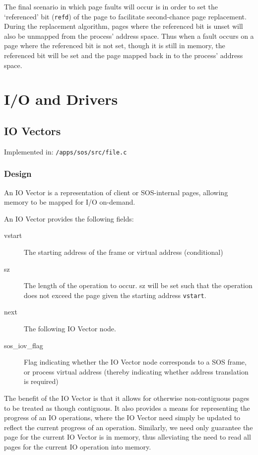 \documentclass[a4paper,12pt]{article}
\begin{document}
The final scenario in which page faults will occur is in order to set the
`referenced' bit (\texttt{refd}) of the page to facilitate second-chance page
replacement.  During the replacement algorithm, pages where the referenced bit
is unset will also be unmapped from the process' address space.  Thus when a
fault occurs on a page where the referenced bit is not set, though it is still
in memory, the referenced bit will be set and the page mapped back in to the
process' address space.

\section{I/O and Drivers}
\subsection{IO Vectors}
Implemented in: \texttt{/apps/sos/src/file.c}

\subsubsection{Design}
An IO Vector is a representation of client or SOS-internal pages, allowing
memory to be mapped for I/O on-demand.

An IO Vector provides the following fields:
\begin{description}
\item[vstart] The starting address of the frame or virtual address (conditional)
\item[sz] The length of the operation to occur.  sz will be set such that the
  operation does not exceed the page given the starting address \texttt{vstart}.
\item[next] The following IO Vector node.
\item[sos\_iov\_flag] Flag indicating whether the IO Vector node corresponds to
  a SOS frame, or process virtual address (thereby indicating whether
  address translation is required)
\end{description}

The benefit of the IO Vector is that it allows for otherwise non-contiguous
pages to be treated as though contiguous.  It also provides a means for
representing the progress of an IO operations, where the IO Vector need simply
be updated to reflect the current progress of an operation.  Similarly, we
need only guarantee the page for the current IO Vector is in memory, thus
alleviating the need to read all pages for the current IO operation into
memory.
\end{document}
